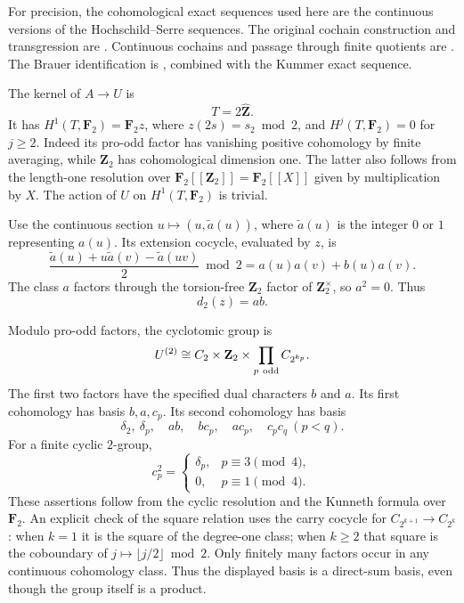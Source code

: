 For precision, the cohomological exact sequences used here are
the continuous versions of the Hochschild--Serre sequences.
The original cochain construction and transgression are
\cite[Chapter~II, pp.~118--119; Chapter~III, Theorem~2 and the
remark on pp.~129--130]{HochschildSerre1953}.
Continuous cochains and passage through finite quotients are
\cite[II, \S4, Proposition~4.2, pp.~87--88]{MilneCFT}.
The Brauer identification is
\cite[IV, Theorem~3.14, p.~137]{MilneCFT}, combined
with the Kummer exact sequence.

The kernel of \(A\to U\) is
\[
 T=2\widehat{\mathbf Z}.
\]
It has \(H^1(T,\mathbf F_2)=\mathbf F_2 z\), where
\(z(2s)=s_2\bmod2\), and \(H^j(T,\mathbf F_2)=0\) for \(j\ge2\).
Indeed its pro-odd factor has vanishing positive cohomology
by finite averaging, while \(\mathbf Z_2\) has cohomological
dimension one. The latter also follows from the length-one
resolution over \(\mathbf F_2[[\mathbf Z_2]]=\mathbf F_2[[X]]\)
given by multiplication by \(X\).
The action of \(U\) on \(H^1(T,\mathbf F_2)\) is trivial.

Use the continuous section \(u\mapsto(u,\widetilde a(u))\),
where \(\widetilde a(u)\) is the integer \(0\) or \(1\)
representing \(a(u)\). Its extension cocycle, evaluated by \(z\), is
\[
 \frac{\widetilde a(u)+u\widetilde a(v)
                    -\widetilde a(uv)}2\bmod2
 =a(u)a(v)+b(u)a(v).
\]
The class \(a\) factors through the torsion-free
\(\mathbf Z_2\) factor of \(\mathbf Z_2^\times\), so \(a^2=0\).
Thus
\begin{equation}\label{eq:fr-Y2-extension-class}
                         d_2(z)=ab.
\end{equation}

Modulo pro-odd factors, the cyclotomic group is
\[
 U^{(2)}\cong C_2\times\mathbf Z_2
                   \times\prod_{p\ {\rm odd}} C_{2^{k_p}}.
\]
The first two factors have the specified dual characters
\(b\) and \(a\). Its first cohomology has basis
\(b,a,c_p\). Its second cohomology has basis
\begin{equation}\label{eq:fr-Y2-U2-basis}
 \delta_2,\ \delta_p,\quad
 ab,\quad bc_p,\quad ac_p,\quad c_pc_q\ (p<q).
\end{equation}
For a finite cyclic \(2\)-group,
\[
 c_p^2=
 \begin{cases}
  \delta_p,&p\equiv3\pmod4,\\
  0,&p\equiv1\pmod4.
 \end{cases}
\]
These assertions follow from the cyclic resolution and the
Kunneth formula over \(\mathbf F_2\). An explicit check of the
square relation uses the carry cocycle for
\(C_{2^{k+1}}\to C_{2^k}\): when \(k=1\) it is the square of
the degree-one class; when \(k\ge2\) that square is the
coboundary of \(j\mapsto\lfloor j/2\rfloor\bmod2\).
Only finitely many factors occur in any continuous cohomology
class. Thus the displayed basis is a direct-sum basis,
even though the group itself is a product.

